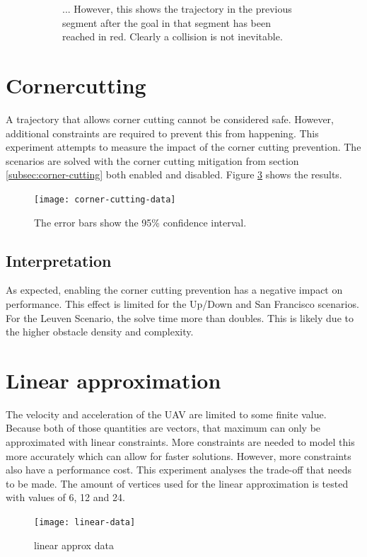 \begin{figure}
\begin{subfigure}[t]{.45\textwidth}
        		\caption{... However, this shows the trajectory in the previous segment after the goal in that segment has been reached in red. Clearly a collision is not inevitable.}
        		\label{fig:leuven-fail-post}
	\end{subfigure}	
	
        
    \caption{}\label{fig:leuven-fail}
\end{figure}



\clearpage
\section{Cornercutting}
\label{subsec:cutting}
A trajectory that allows corner cutting cannot be considered safe. However, additional constraints are required to prevent this from happening. This experiment attempts to measure the impact of the corner cutting prevention. The scenarios are solved with the corner cutting mitigation from section \ref{subsec:corner-cutting} both enabled and disabled. Figure \ref{fig:corner-data} shows the results. 

\begin{figure}[]
	\centering
	\texttt{[image: corner-cutting-data]}
	\caption{The error bars show the 95\% confidence interval.}
	\label{fig:corner-data}
\end{figure}

\subsection{Interpretation}
As expected, enabling the corner cutting prevention has a negative impact on performance. This effect is limited for the Up/Down and San  Francisco scenarios. For the Leuven Scenario, the solve time more than doubles. This is likely due to the higher obstacle density and complexity.


\clearpage
\section{Linear approximation}
\label{subsec:lin-approx}
The velocity and acceleration of the UAV are limited to some finite value. Because both of those quantities are vectors, that maximum can only be approximated with linear constraints. More constraints are needed to model this more accurately which can allow for faster solutions. However, more constraints also have a performance cost. This experiment analyses the trade-off that needs to be made. The amount of vertices used for the linear approximation is tested with values of 6, 12 and 24.
\begin{figure}[]
	\centering
	\texttt{[image: linear-data]}
	\caption{linear approx data}
	\label{fig:linear-approx-data}
\end{figure}




